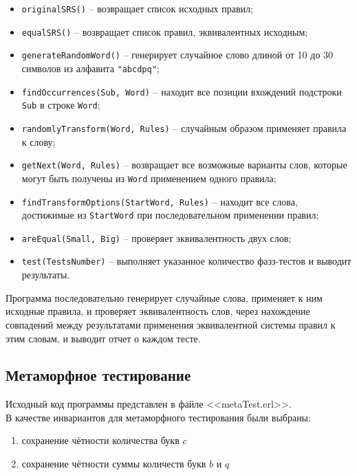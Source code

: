 \documentclass[a4paper,12pt]{article}
\begin{document}
\begin{itemize}[parsep=-1pt]
    \item \verb|originalSRS()| – возвращает список исходных правил;
    \item \verb|equalSRS()| – возвращает список правил, эквивалентных исходным;
    \item \verb|generateRandomWord()| – генерирует случайное слово длиной от 10 до 30 символов из алфавита \verb|"abcdpq"|;
    \item \verb|findOccurrences(Sub, Word)| – находит все позиции вхождений подстроки \verb|Sub| в строке \verb|Word|;
    \item \verb|randomlyTransform(Word, Rules)| – случайным образом применяет правила к слову;
    \item \verb|getNext(Word, Rules)| – возвращает все возможные варианты слов, которые могут быть получены из \verb|Word| применением одного правила;
    \item \verb|findTransformOptions(StartWord, Rules)| – находит все слова, достижимые из \verb|StartWord| при последовательном применении правил;
    \item \verb|areEqual(Small, Big)| – проверяет эквивалентность двух слов;
    \item \verb|test(TestsNumber)| – выполняет указанное количество фазз-тестов и выводит результаты.
\end{itemize}

Программа последовательно генерирует случайные слова, применяет к ним исходные правила, и проверяет эквивалентность слов, через нахождение совпадений между результатами применения эквивалентной системы правил к этим словам, и выводит отчет о каждом тесте.

\subsection{Метаморфное тестирование}

Исходный код программы представлен в файле <<metaTest.erl>>.\\

В качестве инвариантов для метаморфного тестирования были выбраны:

\begin{enumerate}[parsep=-1pt]
    \item сохранение чётности количества букв $c$
    \item сохранение чётности суммы количеств букв $b$ и $q$
\end{enumerate}
\end{document}
